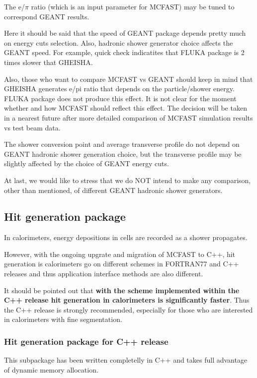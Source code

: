The e/$\pi$ ratio (which is an input parameter for MCFAST) may be tuned to correspond 
GEANT results.

Here it should be said that the speed of GEANT package depends pretty
much on energy cuts selection. Also, hadronic shower generator choice
affects the GEANT speed. For example, quick check indicatites that
FLUKA package is 2 times slower that GHEISHA. 

Also, those who want to compare MCFAST vs GEANT should keep in mind
that GHEISHA generates e/pi ratio that depends on the particle/shower
energy. FLUKA package does not produce this effect. It is not clear for 
the moment whether and how MCFAST should reflect this effect. The decision
will be taken in a nearest future after more detailed comparison of MCFAST
simulation results vs test beam data.

The shower conversion point and average transverse profile do not
depend on GEANT hadronic shower generation choice, but the transverse   
profile may be slightly affected by the choice of GEANT energy cuts.

At last, we would like to stress that we do NOT intend to make    
any comparison, other than mentioned, of different GEANT hadronic 
shower generators.

\subsection{Hit generation package}

In calorimeters, energy depositions in cells are recorded as a shower propagates.

However, with the ongoing upgrate and migration of MCFAST to C++, hit generation
is calorimeters go on different schemes in FORTRAN77 and C++ releases and thus
application interface methods are also different.

It should be pointed out that {\bf with the scheme implemented within the C++ 
release hit generation in calorimeters is significantly faster}. Thus the C++ 
release is strongly recommended, especially for those who are interested in 
calorimeters with fine segmentation.   

\subsubsection{Hit generation package for C++ release}

This subpackage has been written completelly in C++ and takes full advantage
of dynamic memory allocation.

